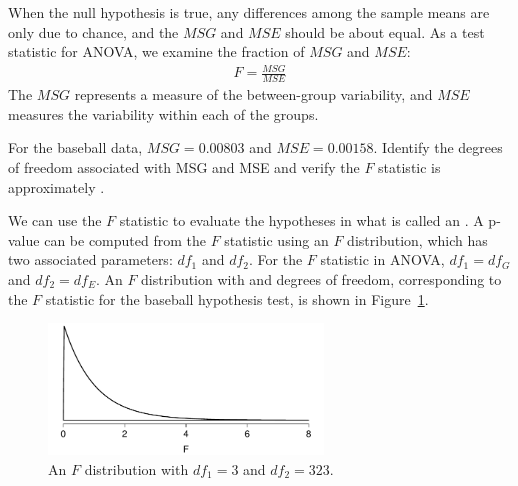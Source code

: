When the null hypothesis is true, any differences among the sample means are only due to chance, and the $MSG$ and $MSE$ should be about equal. As a test statistic for ANOVA, we examine the fraction of $MSG$ and $MSE$:
\begin{align*}
F = \frac{MSG}{MSE}
\end{align*}
The $MSG$ represents a measure of the between-group variability, and $MSE$ measures the variability within each of the groups.

\begin{exercisewrap}
\begin{nexercise}
For the baseball data, $MSG = 0.00803$ and $MSE=0.00158$.
Identify the degrees of freedom associated with MSG and
MSE and verify the $F$ statistic is approximately
\mlbF{}.\footnotemark{}
\end{nexercise}
\end{exercisewrap}

We can use the $F$ statistic to evaluate the hypotheses in what is called an .
A p-value can be computed from the $F$ statistic using an $F$ distribution, which has two associated parameters: $df_{1}$ and $df_{2}$.
For the $F$ statistic in ANOVA, $df_{1} = df_{G}$ and $df_{2} = df_{E}$.
An $F$ distribution with \mlbDFA{} and \mlbDFB{} degrees of freedom, corresponding to the $F$ statistic for the baseball hypothesis test, is shown in Figure~\ref{fDist2And423}.

\begin{figure}[ht]
\centering
\includegraphics[width=0.65\textwidth]{ch_inference_for_means/figures/fDist2And423/fDist2And423}
\caption{An $F$ distribution with $df_1=3$ and $df_2=323$.}
\label{fDist2And423}
\end{figure}

